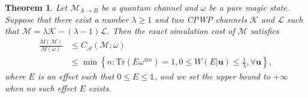 \documentclass[aps,pra,twocolumn,floatfix,amsfonts,10pt]{revtex4-2}
\newtheorem{theorem}{Theorem}
\begin{document}
\begin{theorem}\label{theorem 2}
	Let $\mathcal{M}_{A\rightarrow B}$ be a quantum channel and $\omega$ be a pure magic state. 
	Suppose that there exist a number $\lambda \geqslant 1$ and two CPWP channels $\mathcal{K}$ and $\mathcal{L}$ such that $\mathcal{M} = \lambda \mathcal{K} - (\lambda-1)\mathcal{L}$. 
	Then the exact simulation cost of $\mathcal{M}$ satisfies
	\begin{equation}
		\begin{aligned}
			\frac{M(\mathcal{M})}{M(\omega)} &\leqslant C_{\mathcal{A}}(\mathcal{M};\omega) \\ &\leqslant \min\left\{n:\mathrm{Tr}(E\omega^{\otimes n})=1,0\leqslant W(E|\mathbf{u}) \leqslant \frac{1}{\lambda},  \forall\mathbf{u}\right\},
		\end{aligned}
	\end{equation}
	where $E$ is an effect such that $0 \leqslant E \leqslant \mathds{1}$, and we set the upper bound to $+\infty$ when no such effect $E$ exists.
	
\end{theorem}
\end{document}
